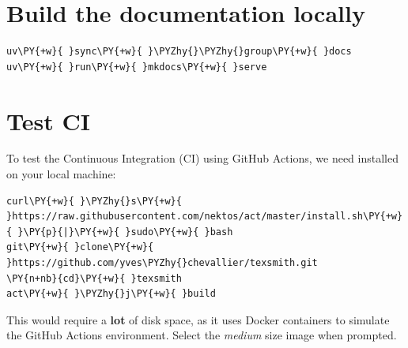 \documentclass[a4paper,twoside]{article}
\begin{document}
\section{Build the documentation locally}
\begin{tscode}[lang=bash, engine=pygments]
\begin{Verbatim}[commandchars=\\\{\},breaklines, breakanywhere, commandchars=\\\{\}]
uv\PY{+w}{ }sync\PY{+w}{ }\PYZhy{}\PYZhy{}group\PY{+w}{ }docs
uv\PY{+w}{ }run\PY{+w}{ }mkdocs\PY{+w}{ }serve
\end{Verbatim}
\end{tscode}
\section{Test CI}
To test the Continuous Integration (CI) using GitHub Actions, we need  installed on your local machine:
\begin{tscode}[lang=bash, engine=pygments]
\begin{Verbatim}[commandchars=\\\{\},breaklines, breakanywhere, commandchars=\\\{\}]
curl\PY{+w}{ }\PYZhy{}s\PY{+w}{ }https://raw.githubusercontent.com/nektos/act/master/install.sh\PY{+w}{ }\PY{p}{|}\PY{+w}{ }sudo\PY{+w}{ }bash
git\PY{+w}{ }clone\PY{+w}{ }https://github.com/yves\PYZhy{}chevallier/texsmith.git
\PY{n+nb}{cd}\PY{+w}{ }texsmith
act\PY{+w}{ }\PYZhy{}j\PY{+w}{ }build
\end{Verbatim}
\end{tscode}
This would require a \textbf{lot} of disk space, as it uses Docker containers to simulate the GitHub Actions environment. Select the \emph{medium} size image when prompted.
\end{document}
